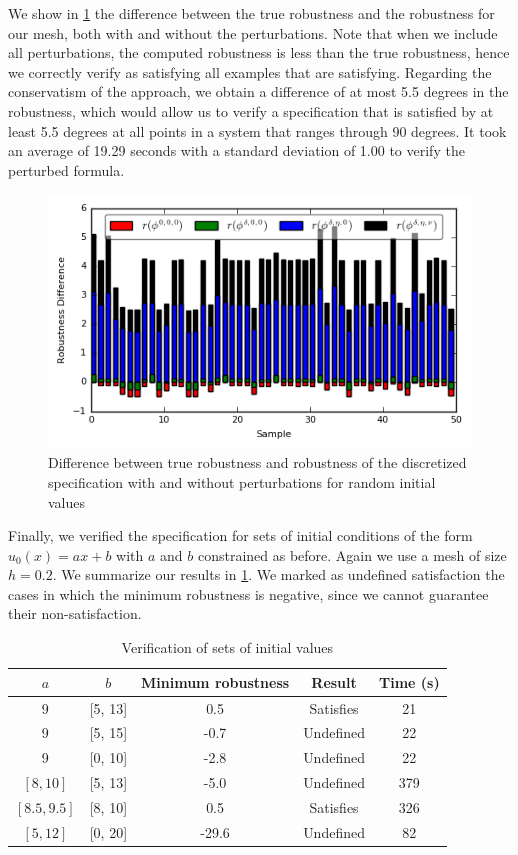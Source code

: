\documentclass[oribibl]{llncs/llncs}
\begin{document}
We show in \cref{fig:res_diffs} the difference between the true robustness and
the robustness for our mesh, both with and without the perturbations. Note that
when we include all perturbations, the computed robustness is less than the true
robustness, hence we correctly verify as satisfying all examples
that are satisfying. Regarding the conservatism of the approach, we obtain a
difference of at most 5.5 degrees in the robustness, which would allow us to verify a
specification that is satisfied by at least 5.5 degrees at all points in a system
that ranges through 90 degrees. It took an average of 19.29 seconds with a
standard deviation of 1.00 to verify the perturbed formula.

\begin{figure}
    \centering
    \includegraphics[width=0.8\linewidth]{figures/cs_ran_init_results.png}
    \caption{Difference between true robustness and robustness of the
        discretized specification with and without perturbations for
        random initial values}
    \label{fig:res_diffs}
\end{figure}


Finally, we verified the specification for sets of initial conditions of the
form $u_0(x) = a x + b$ with $a$ and $b$ constrained as before. Again we use a
mesh of size $h = 0.2$. We summarize our results in \cref{tab:res_sets}. We
marked as undefined satisfaction the cases in which the minimum robustness is
negative, since we cannot guarantee their non-satisfaction.

\begin{table}
\centering
\begin{tabular}{|c|c|c|c|c|}
    \hline
    $a$ & $b$ & Minimum robustness & Result & Time (s)  \\
    \hline
    9 & [5, 13] & 0.5 & Satisfies & 21 \\
    9 & [5, 15] & -0.7 & Undefined & 22 \\
    9 & [0, 10] & -2.8 & Undefined & 22 \\
    $[8, 10]$ & [5, 13] & -5.0 & Undefined & 379 \\
    $[8.5, 9.5]$ & [8, 10] & 0.5 & Satisfies & 326 \\
    $[5, 12]$ & [0, 20] & -29.6 & Undefined & 82 \\
    \hline
\end{tabular}
\caption{Verification of sets of initial values}
\label{tab:res_sets}
\end{table}
\end{document}
